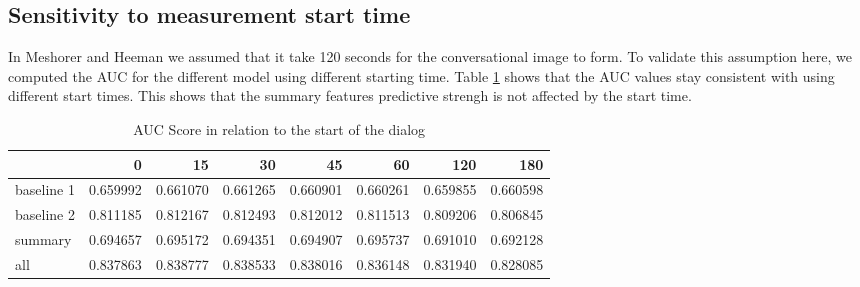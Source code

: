 \subsection{Sensitivity to measurement start time}

In Meshorer and Heeman \cite{Meshorer2016UsingPS} we assumed that it take 120 seconds for the conversational image to form. To validate this assumption here, we computed the AUC for the different model using different starting time. Table \ref{table:starttime} shows that the AUC values stay consistent with using different start times. This shows that the summary features predictive strengh is not affected by the start time.

%
\begin{table}[ht!]
\begin{center}
\begin{tabular}{lrrrrrrr}
\toprule
{} & 0 & 15 & 30 & 45 & 60 & 120 & 180  \\
\midrule
baseline 1 & 0.659992 & 0.661070 & 0.661265 & 0.660901  & 0.660261 & 0.659855 & 0.660598  \\
baseline 2 & 0.811185 & 0.812167 & 0.812493 & 0.812012  & 0.811513 & 0.809206 & 0.806845  \\
summary    & 0.694657 & 0.695172 & 0.694351 & 0.694907  & 0.695737 & 0.691010 & 0.692128  \\
all        & 0.837863 & 0.838777 & 0.838533 & 0.838016  & 0.836148 & 0.831940 & 0.828085  \\

\bottomrule
\end{tabular}
\end{center}
\caption{ AUC Score in relation to the start of the dialog }
\label{table:starttime}
\end{table}



